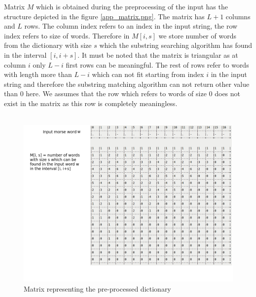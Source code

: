 \documentclass[a4paper]{article}
\begin{document}
Matrix $M$ which is obtained during the preprocessing of the input has the structure depicted in the figure \ref{app_matrix.png}. The matrix has $L + 1$ columns and $L$ rows. The column index refers to an index in the input string, the row index refers to size of words. Therefore in $M[i, s]$ we store number of words from the dictionary with size $s$ which the substring searching algorithm has found in the interval $[i, i + s]$. It must be noted that the matrix is triangular as at column $i$ only $L-i$ first rows can be meaningful. The rest of rows refer to words with length more than $L-i$ which can not fit starting from index $i$ in the input string and therefore the substring matching algorithm can not return other value than 0 here. We assumes that the row which refers to words of size $0$ does not exist in the matrix as this row is completely meaningless.\\\\
\begin{figure}[ht!]
	\label{app_matrix.png}
	\center
	\includegraphics[width=0.8\linewidth]{app_matrix.png}
	\caption{Matrix representing the pre-processed dictionary}
	\label{preprocessing}
\end{figure}
\end{document}

